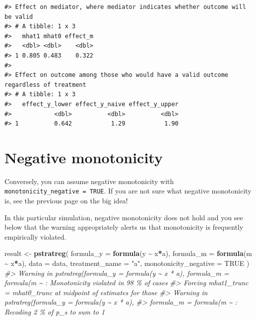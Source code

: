 \documentclass[
]{book}
\newenvironment{Shaded}{\begin{snugshade}}{\end{snugshade}}
\newcommand{\AttributeTok}[1]{\textcolor[rgb]{0.13,0.29,0.53}{#1}}
\newcommand{\CommentTok}[1]{\textcolor[rgb]{0.56,0.35,0.01}{\textit{#1}}}
\newcommand{\ConstantTok}[1]{\textcolor[rgb]{0.56,0.35,0.01}{#1}}
\newcommand{\FunctionTok}[1]{\textcolor[rgb]{0.13,0.29,0.53}{\textbf{#1}}}
\newcommand{\NormalTok}[1]{#1}
\newcommand{\OtherTok}[1]{\textcolor[rgb]{0.56,0.35,0.01}{#1}}
\newcommand{\SpecialCharTok}[1]{\textcolor[rgb]{0.81,0.36,0.00}{\textbf{#1}}}
\newcommand{\StringTok}[1]{\textcolor[rgb]{0.31,0.60,0.02}{#1}}
\begin{document}
\begin{verbatim}
#> Effect on mediator, where mediator indicates whether outcome will be valid
#> # A tibble: 1 x 3
#>   mhat1 mhat0 effect_m
#>   <dbl> <dbl>    <dbl>
#> 1 0.805 0.483    0.322
#> 
#> Effect on outcome among those who would have a valid outcome regardless of treatment
#> # A tibble: 1 x 3
#>   effect_y_lower effect_y_naive effect_y_upper
#>            <dbl>          <dbl>          <dbl>
#> 1          0.642           1.29           1.90
\end{verbatim}

\hypertarget{negative-monotonicity}{%
\section{Negative monotonicity}\label{negative-monotonicity}}

Conversely, you can assume negative monotonicity with \texttt{monotonicity\_negative\ =\ TRUE}. If you are not sure what negative monotonicity is, see the previous page on the big idea!

In this particular simulation, negative monotonicity does not hold and you see below that the warning appropriately alerts us that monotonicity is frequently empirically violated.

\begin{Shaded}
\begin{Highlighting}[]
\NormalTok{result }\OtherTok{\textless{}{-}} \FunctionTok{pstratreg}\NormalTok{(}
  \AttributeTok{formula\_y =} \FunctionTok{formula}\NormalTok{(y }\SpecialCharTok{\textasciitilde{}}\NormalTok{ x}\SpecialCharTok{*}\NormalTok{a),}
  \AttributeTok{formula\_m =} \FunctionTok{formula}\NormalTok{(m }\SpecialCharTok{\textasciitilde{}}\NormalTok{ x}\SpecialCharTok{*}\NormalTok{a),}
  \AttributeTok{data =}\NormalTok{ data,}
  \AttributeTok{treatment\_name =} \StringTok{"a"}\NormalTok{,}
  \AttributeTok{monotonicity\_negative =} \ConstantTok{TRUE}
\NormalTok{)}
\CommentTok{\#\textgreater{} Warning in pstratreg(formula\_y = formula(y \textasciitilde{} x * a), formula\_m = formula(m \textasciitilde{} : Monotonicity violated in 98 \% of cases}
\CommentTok{\#\textgreater{} Forcing mhat1\_trunc = mhat0\_trunc at midpoint of estimates for those}
\CommentTok{\#\textgreater{} Warning in pstratreg(formula\_y = formula(y \textasciitilde{} x * a),}
\CommentTok{\#\textgreater{} formula\_m = formula(m \textasciitilde{} : Recoding 2 \% of p\_s to sum to 1}
\end{Highlighting}
\end{Shaded}
\end{document}
